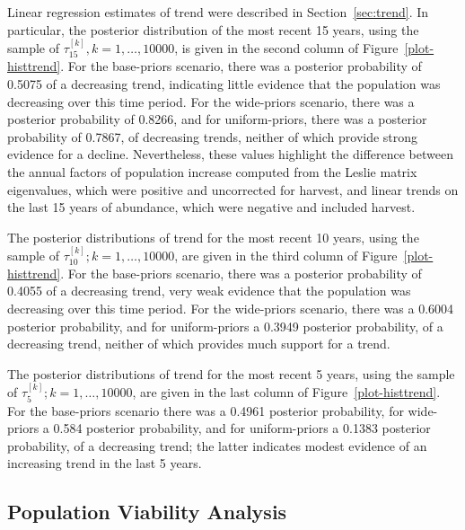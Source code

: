 \documentclass[]{risa}\usepackage[]{graphicx}\usepackage[]{color}
\begin{document}
Linear regression estimates of trend were described in Section~\ref{sec:trend}.  In particular, the posterior distribution of the most recent 15 years, using the sample of $\tau^{[k]}_{15}, k = 1,\ldots,10000$, is given in the second column of Figure~\ref{plot-histtrend}.  For the base-priors scenario, there was a posterior probability of 0.5075 of a decreasing trend, indicating little evidence that the population was decreasing over this time period. For the wide-priors scenario, there was a posterior probability of 0.8266, and for uniform-priors, there was a posterior probability of 0.7867, of decreasing trends, neither of which provide strong evidence for a decline.  Nevertheless, these values highlight the difference between the annual factors of population increase computed from the Leslie matrix eigenvalues, which were positive and uncorrected for harvest, and linear trends on the last 15 years of abundance, which were negative and included harvest. 

The posterior distributions of trend for the most recent 10 years, using the sample of $\tau^{[k]}_{10}; k = 1,\ldots,10000$, are given in the third column of Figure~\ref{plot-histtrend}.  For the base-priors scenario, there was a posterior probability of 0.4055 of a decreasing trend, very weak evidence that the population was decreasing over this time period. For the wide-priors scenario, there was a 0.6004 posterior probability, and for uniform-priors a 0.3949 posterior probability, of a decreasing trend, neither of which provides much support for a trend. 

The posterior distributions of trend for the most recent 5 years, using the sample of $\tau^{[k]}_{5}; k = 1,\ldots,10000$, are given in the last column of Figure~\ref{plot-histtrend}.  For the base-priors scenario there was a 0.4961 posterior probability, for wide-priors a 0.584 posterior probability, and for uniform-priors a 0.1383 posterior probability, of a decreasing trend; the latter indicates modest evidence of an increasing trend in the last 5 years.


\subsection{Population Viability Analysis}
\end{document}
